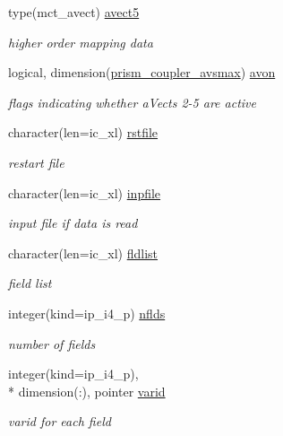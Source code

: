 \begin{DoxyCompactItemize}
type(mct\+\_\+avect) \hyperlink{structmod__oasis__coupler_1_1prism__coupler__type_a939d1987d5c66c2352ff40709f255980}{avect5}
\begin{DoxyCompactList}\small\item\em higher order mapping data \end{DoxyCompactList}\item 
logical, dimension(\hyperlink{classmod__oasis__coupler_a6f166f099a134dffba97a168d28a3c01}{prism\+\_\+coupler\+\_\+avsmax}) \hyperlink{structmod__oasis__coupler_1_1prism__coupler__type_aa2090cc6941c0dbbbf4bdb5c68cff873}{avon}
\begin{DoxyCompactList}\small\item\em flags indicating whether a\+Vects 2-\/5 are active \end{DoxyCompactList}\item 
character(len=ic\+\_\+xl) \hyperlink{structmod__oasis__coupler_1_1prism__coupler__type_a8a660e192210d1e8ff71f7dded631dce}{rstfile}
\begin{DoxyCompactList}\small\item\em restart file \end{DoxyCompactList}\item 
character(len=ic\+\_\+xl) \hyperlink{structmod__oasis__coupler_1_1prism__coupler__type_a0ecb3c23d7b761aa9bfad0fbb59e40d3}{inpfile}
\begin{DoxyCompactList}\small\item\em input file if data is read \end{DoxyCompactList}\item 
character(len=ic\+\_\+xl) \hyperlink{structmod__oasis__coupler_1_1prism__coupler__type_a559f90a9b77db151a2a39802a66ddf2b}{fldlist}
\begin{DoxyCompactList}\small\item\em field list \end{DoxyCompactList}\item 
integer(kind=ip\+\_\+i4\+\_\+p) \hyperlink{structmod__oasis__coupler_1_1prism__coupler__type_a08fa25cab6817cfbc0c660a4f51d3857}{nflds}
\begin{DoxyCompactList}\small\item\em number of fields \end{DoxyCompactList}\item 
integer(kind=ip\+\_\+i4\+\_\+p), \\*
dimension(\+:), pointer \hyperlink{structmod__oasis__coupler_1_1prism__coupler__type_a9e31592685ea4cb2da222187ee2ffa4b}{varid}
\begin{DoxyCompactList}\small\item\em varid for each field \end{DoxyCompactList}\item 

\end{DoxyCompactItemize}
